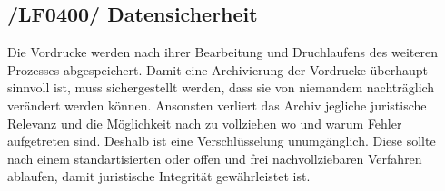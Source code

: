 \subsection{/LF0400/ Datensicherheit}
Die Vordrucke werden nach ihrer Bearbeitung und Druchlaufens des weiteren Prozesses abgespeichert.
Damit eine Archivierung der Vordrucke überhaupt sinnvoll ist, muss sichergestellt werden, dass sie von niemandem  
nachträglich verändert werden können. Ansonsten verliert das Archiv jegliche juristische Relevanz und die Möglichkeit nach zu vollziehen wo und warum Fehler aufgetreten sind. 
Deshalb ist eine Verschlüsselung unumgänglich. Diese sollte nach einem standartisierten oder offen und frei nachvollziebaren Verfahren ablaufen, damit juristische Integrität gewährleistet ist. 
